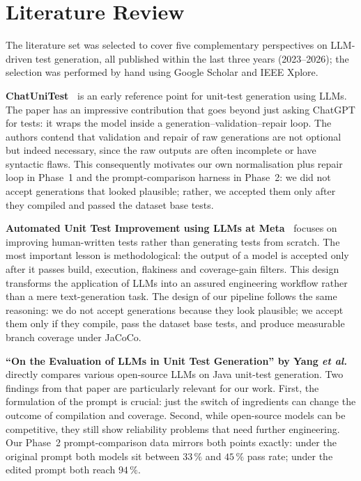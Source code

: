 \documentclass[journal]{IEEEtran}
\begin{document}
\section{Literature Review}\label{sec:lit}

The literature set was selected to cover five complementary perspectives
on LLM-driven test generation, all published within the last three years
(2023--2026); the selection was performed by hand using Google Scholar
and IEEE Xplore.

\textbf{ChatUniTest~\cite{chatunitest}} is an early reference point for
unit-test generation using LLMs. The paper has an impressive contribution
that goes beyond just asking ChatGPT for tests: it wraps the model inside
a generation--validation--repair loop. The authors contend that
validation and repair of raw generations are not optional but indeed
necessary, since the raw outputs are often incomplete or have syntactic
flaws. This consequently motivates our own normalisation plus repair
loop in Phase~1 and the prompt-comparison harness in Phase~2: we did
not accept generations that looked plausible; rather, we accepted them
only after they compiled and passed the dataset base tests.

\textbf{Automated Unit Test Improvement using LLMs at
Meta~\cite{metatestgen}} focuses on improving human-written tests rather
than generating tests from scratch. The most important lesson is
methodological: the output of a model is accepted only after it passes
build, execution, flakiness and coverage-gain filters. This design
transforms the application of LLMs into an assured engineering workflow
rather than a mere text-generation task. The design of our pipeline
follows the same reasoning: we do not accept generations because they
look plausible; we accept them only if they compile, pass the dataset
base tests, and produce measurable branch coverage under JaCoCo.

\textbf{``On the Evaluation of LLMs in Unit Test Generation'' by Yang
\emph{et al.}~\cite{yang2024}} directly compares various open-source LLMs
on Java unit-test generation. Two findings from that paper are
particularly relevant for our work. First, the formulation of the prompt
is crucial: just the switch of ingredients can change the outcome of
compilation and coverage. Second, while open-source models can be
competitive, they still show reliability problems that need further
engineering. Our Phase~2 prompt-comparison data mirrors both points
exactly: under the original prompt both models sit between $33\,\%$ and
$45\,\%$ pass rate; under the edited prompt both reach $94\,\%$.
\end{document}
